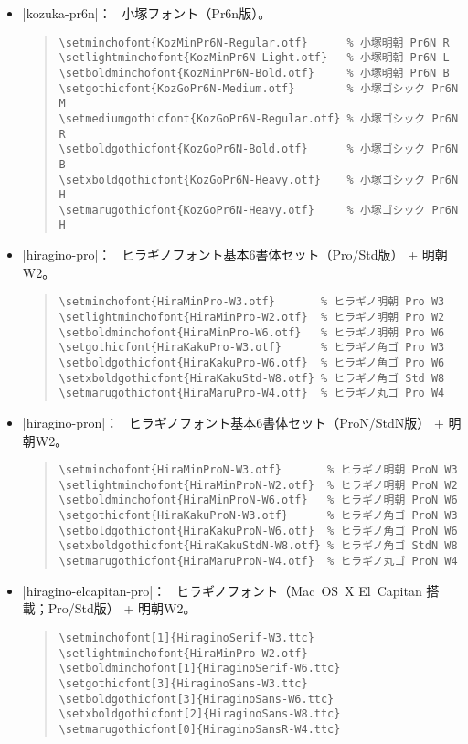 \documentclass[uplatex,dvipdfmx,a4paper]{jsarticle}
\newcommand{\Means}{：\ }
\begin{document}
\begin{itemize}
\item |kozuka-pr6n|\Means
  小塚フォント（Pr6n版）。
\begin{quote}\small\begin{verbatim}
\setminchofont{KozMinPr6N-Regular.otf}      % 小塚明朝 Pr6N R
\setlightminchofont{KozMinPr6N-Light.otf}   % 小塚明朝 Pr6N L
\setboldminchofont{KozMinPr6N-Bold.otf}     % 小塚明朝 Pr6N B
\setgothicfont{KozGoPr6N-Medium.otf}        % 小塚ゴシック Pr6N M
\setmediumgothicfont{KozGoPr6N-Regular.otf} % 小塚ゴシック Pr6N R
\setboldgothicfont{KozGoPr6N-Bold.otf}      % 小塚ゴシック Pr6N B
\setxboldgothicfont{KozGoPr6N-Heavy.otf}    % 小塚ゴシック Pr6N H
\setmarugothicfont{KozGoPr6N-Heavy.otf}     % 小塚ゴシック Pr6N H
\end{verbatim}\end{quote}

\item |hiragino-pro|\Means
  ヒラギノフォント基本6書体セット（Pro/Std版） + 明朝W2。
\begin{quote}\small\begin{verbatim}
\setminchofont{HiraMinPro-W3.otf}       % ヒラギノ明朝 Pro W3
\setlightminchofont{HiraMinPro-W2.otf}  % ヒラギノ明朝 Pro W2
\setboldminchofont{HiraMinPro-W6.otf}   % ヒラギノ明朝 Pro W6
\setgothicfont{HiraKakuPro-W3.otf}      % ヒラギノ角ゴ Pro W3
\setboldgothicfont{HiraKakuPro-W6.otf}  % ヒラギノ角ゴ Pro W6
\setxboldgothicfont{HiraKakuStd-W8.otf} % ヒラギノ角ゴ Std W8
\setmarugothicfont{HiraMaruPro-W4.otf}  % ヒラギノ丸ゴ Pro W4
\end{verbatim}\end{quote}

\item |hiragino-pron|\Means
  ヒラギノフォント基本6書体セット（ProN/StdN版） + 明朝W2。
\begin{quote}\small\begin{verbatim}
\setminchofont{HiraMinProN-W3.otf}       % ヒラギノ明朝 ProN W3
\setlightminchofont{HiraMinProN-W2.otf}  % ヒラギノ明朝 ProN W2
\setboldminchofont{HiraMinProN-W6.otf}   % ヒラギノ明朝 ProN W6
\setgothicfont{HiraKakuProN-W3.otf}      % ヒラギノ角ゴ ProN W3
\setboldgothicfont{HiraKakuProN-W6.otf}  % ヒラギノ角ゴ ProN W6
\setxboldgothicfont{HiraKakuStdN-W8.otf} % ヒラギノ角ゴ StdN W8
\setmarugothicfont{HiraMaruProN-W4.otf}  % ヒラギノ丸ゴ ProN W4
\end{verbatim}\end{quote}

\item |hiragino-elcapitan-pro|\Means
  ヒラギノフォント（Mac~OS~X El~Capitan 搭載；Pro/Std版） + 明朝W2。
\begin{quote}\small\begin{verbatim}
\setminchofont[1]{HiraginoSerif-W3.ttc}
\setlightminchofont{HiraMinPro-W2.otf}
\setboldminchofont[1]{HiraginoSerif-W6.ttc}
\setgothicfont[3]{HiraginoSans-W3.ttc}
\setboldgothicfont[3]{HiraginoSans-W6.ttc}
\setxboldgothicfont[2]{HiraginoSans-W8.ttc}
\setmarugothicfont[0]{HiraginoSansR-W4.ttc}
\end{verbatim}\end{quote}


\end{itemize}
\end{document}

